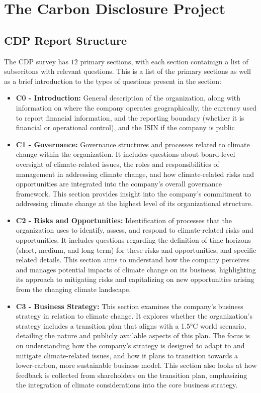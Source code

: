 \chapter{The Carbon Disclosure Project}

\section{CDP Report Structure}
The CDP survey has $12$ primary sections, with each section containign a list of subsecitons with relevant questions. This is a list of the primary sections as well as a brief introduction to the types of questions present in the section:
\begin{itemize}
    \item \textbf{C0 - Introduction:} General description of the organization, along with information on where the company operates geographically, the currency used to report financial information, and the reporting boundary (whether it is financial or operational control), and the ISIN if the company is public
    \item \textbf{C1 - Governance:} Governance structures and processes related to climate change within the organization. It includes questions about board-level oversight of climate-related issues, the roles and responsibilities of management in addressing climate change, and how climate-related risks and opportunities are integrated into the company's overall governance framework. This section provides insight into the company's commitment to addressing climate change at the highest level of its organizational structure.
    \item \textbf{C2 - Risks and Opportunities:} Identification of processes that the organization uses to identify, assess, and respond to climate-related risks and opportunities. It includes questions regarding the definition of time horizons (short, medium, and long-term) for these risks and opportunities, and specific related details. This section aims to understand how the company perceives and manages potential impacts of climate change on its business, highlighting its approach to mitigating risks and capitalizing on new opportunities arising from the changing climate landscape.
    \item \textbf{C3 - Business Strategy:} This section examines the company's business strategy in relation to climate change. It explores whether the organization's strategy includes a transition plan that aligns with a 1.5°C world scenario, detailing the nature and publicly available aspects of this plan. The focus is on understanding how the company's strategy is designed to adapt to and mitigate climate-related issues, and how it plans to transition towards a lower-carbon, more sustainable business model. This section also looks at how feedback is collected from shareholders on the transition plan, emphasizing the integration of climate considerations into the core business strategy.

\end{itemize}
